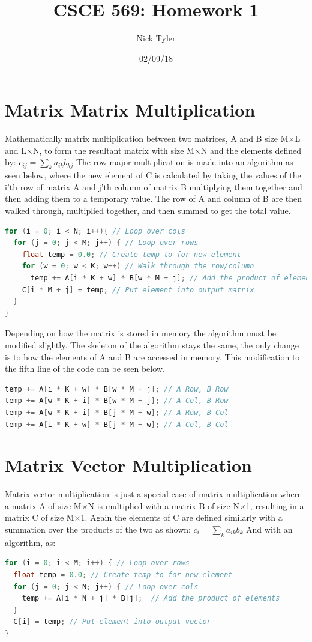 \documentclass[a4paper]{article}
\title{CSCE 569: Homework 1}
\author{Nick Tyler}
\date{02/09/18}
\begin{document}
\maketitle

\section*{Matrix Matrix Multiplication}
Mathematically matrix multiplication between two matrices, A and B size M$\times$L and L$\times$N, to form the resultant matrix with size M$\times$N and the elements defined by: $c_{ij} = \sum_{k} a_{ik}b_{kj}$ 
The row major multiplication is made into an algorithm as seen below, where the new element of C is calculated by taking the values of the i'th row of matrix A and j'th column of matrix B multiplying them together and then adding them to a temporary value. The row of A and column of B are then walked through, multiplied together, and then summed to get the total value.

\begin{lstlisting}[language=C++]
for (i = 0; i < N; i++){ // Loop over cols
  for (j = 0; j < M; j++) { // Loop over rows
    float temp = 0.0; // Create temp to for new element
    for (w = 0; w < K; w++) // Walk through the row/column
      temp += A[i * K + w] * B[w * M + j]; // Add the product of elements
    C[i * M + j] = temp; // Put element into output matrix
  }
}
\end{lstlisting}
Depending on how the matrix is stored in memory the algorithm must be modified slightly. The skeleton of the algorithm stays the same, the only change is to how the elements of A and B are accessed in memory. This modification to the fifth line of the code can be seen below.

\begin{lstlisting}[language=C++]
temp += A[i * K + w] * B[w * M + j]; // A Row, B Row
temp += A[w * K + i] * B[w * M + j]; // A Col, B Row
temp += A[w * K + i] * B[j * M + w]; // A Row, B Col
temp += A[i * K + w] * B[j * M + w]; // A Col, B Col
\end{lstlisting}

\section*{Matrix Vector Multiplication}
Matrix vector multiplication is just a special case of matrix multiplication where a matrix A of size M$\times$N is multiplied with a matrix B of size N$\times$1, resulting in a matrix C of size M$\times$1. Again the elements of C are defined similarly with a summation over the products of the two as shown: $c_{i} = \sum_{k} a_{ik}b_{k}$
And with an algorithm, as:
\begin{lstlisting}[language=C++]
for (i = 0; i < M; i++) { // Loop over rows
  float temp = 0.0; // Create temp to for new element
  for (j = 0; j < N; j++) { // Loop over cols
    temp += A[i * N + j] * B[j];  // Add the product of elements
  }
  C[i] = temp; // Put element into output vector
}
\end{lstlisting}
\end{document}
